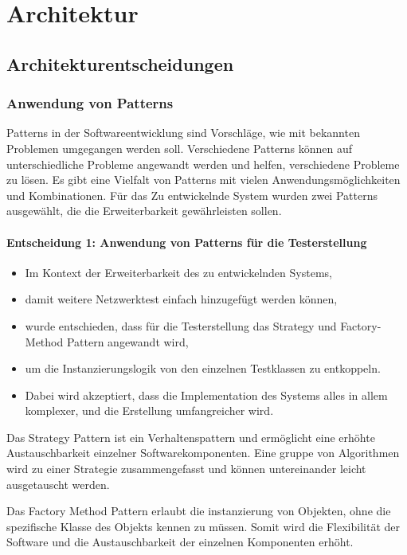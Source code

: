 \documentclass[]{subfiles}
\begin{document}
\section{Architektur}
\subsection{Architekturentscheidungen}
		\subsubsection{Anwendung von Patterns}
		Patterns in der Softwareentwicklung sind Vorschläge, wie mit bekannten Problemen umgegangen werden soll.
		Verschiedene Patterns können auf unterschiedliche Probleme angewandt werden und helfen, verschiedene Probleme zu lösen.
		Es gibt eine Vielfalt von Patterns mit vielen Anwendungsmöglichkeiten und Kombinationen.
		Für das Zu entwickelnde System wurden zwei Patterns ausgewählt, die die Erweiterbarkeit gewährleisten sollen.

		\paragraph{Entscheidung 1: Anwendung von Patterns für die Testerstellung}
		\begin{itemize}
			\item Im Kontext der Erweiterbarkeit des zu entwickelnden Systems,
			\item damit weitere Netzwerktest einfach hinzugefügt werden können,
			\item wurde entschieden, dass für die Testerstellung das Strategy und Factory-Method Pattern angewandt wird,
			\item um die Instanzierungslogik von den einzelnen Testklassen zu entkoppeln.
			\item Dabei wird akzeptiert, dass die Implementation des Systems alles in allem komplexer, und die Erstellung umfangreicher wird.			
		\end{itemize}

		Das Strategy Pattern ist ein Verhaltenspattern und ermöglicht eine erhöhte Austauschbarkeit einzelner Softwarekomponenten.
		Eine gruppe von Algorithmen wird zu einer Strategie zusammengefasst und können untereinander leicht ausgetauscht werden.
		
		Das Factory Method Pattern erlaubt die instanzierung von Objekten, ohne die spezifische Klasse des Objekts kennen zu müssen.
		Somit wird die Flexibilität der Software und die Austauschbarkeit der einzelnen Komponenten erhöht.
		
\end{document}

